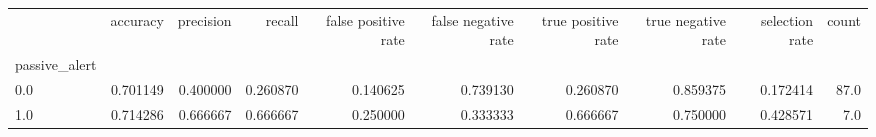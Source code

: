 \begin{tabular}{lrrrrrrrrr}
\toprule
{} &  accuracy &  precision &    recall &  false positive rate &  false negative rate &  true positive rate &  true negative rate &  selection rate &  count \\
passive\_alert &           &            &           &                      &                      &                     &                     &                 &        \\
\midrule
0.0           &  0.701149 &   0.400000 &  0.260870 &             0.140625 &             0.739130 &            0.260870 &            0.859375 &        0.172414 &   87.0 \\
1.0           &  0.714286 &   0.666667 &  0.666667 &             0.250000 &             0.333333 &            0.666667 &            0.750000 &        0.428571 &    7.0 \\
\bottomrule
\end{tabular}
